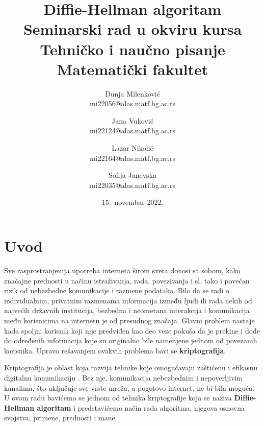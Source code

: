 \documentclass[a4paper]{article}
\begin{document}
\title{Diffie-Hellman algoritam\\ \small{Seminarski rad u okviru kursa\\Tehničko i naučno pisanje\\ Matematički fakultet}}

\author{Dunja Milenković\\ mi22056@alas.matf.bg.ac.rs\and Jana Vuković\\mi22124@alas.matf.bg.ac.rs\and Lazar Nikolić\\mi22164@alas.matf.bg.ac.rs\and Sofija Janevska\\mi22035@alas.matf.bg.ac.rs }
\date{15.~novembar 2022.}
\maketitle


\tableofcontents

\newpage

\section{Uvod}
\label{sec:uvod}
Sve rasprostranjenija upotreba interneta širom sveta donosi sa sobom, kako značajne prednosti u načinu istraživanja, rada, povezivanja i sl. tako i povećan rizik od nebezbedne komunikacije i razmene podataka. Bilo da se radi o individualnim, privatnim razmenama informacija između ljudi ili rada nekih od najvećih državnih institucija, bezbedna i neometana interakcija i komunikacija među korisnicima na internetu je od presudnog značaja. Glavni problem nastaje kada spoljni korisnik koji nije predviđen kao deo veze pokuša da je prekine i dođe do određenih informacija koje su originalno bile namenjene jednom od povezanih korisnika. Upravo rešavanjem ovakvih problema bavi se \textbf{kriptografija}.

Kriptografija je oblast koja razvija tehnike koje omogućavaju zaštićenu i efikasnu digitalnu komunikaciju \cite{cryptography}. Bez nje, komunikacija nebezbednim i nepoverljivim kanalima, što uključuje sve vrste mreža, a pogotovo internet, ne bi bila moguća. U ovom radu bavićemo se jednom od tehnika kriptografije koja se naziva \textbf{Diffie-Hellman algoritam} %
i predstavićemo način rada algoritma, njegova osnovna svojstva, primene, prednosti i mane.
\end{document}
